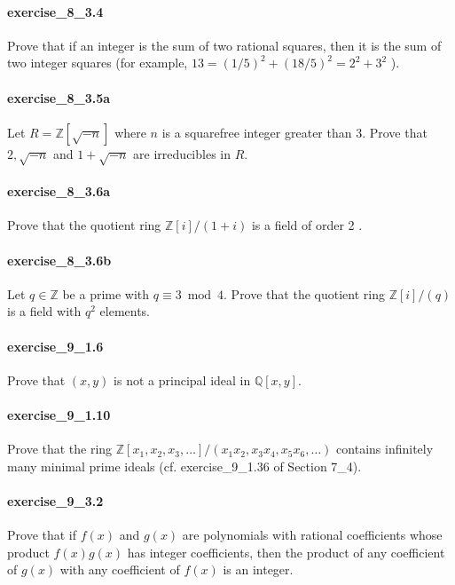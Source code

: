 \documentclass{article}
\begin{document}
\paragraph{exercise\_8\_3.4} Prove that if an integer is the sum of two rational squares, then it is the sum of two integer squares (for example, $13=(1 / 5)^{2}+(18 / 5)^{2}=2^{2}+3^{2}$ ).

\paragraph{exercise\_8\_3.5a} Let $R=\mathbb{Z}[\sqrt{-n}]$ where $n$ is a squarefree integer greater than 3. Prove that $2, \sqrt{-n}$ and $1+\sqrt{-n}$ are irreducibles in $R$.

\paragraph{exercise\_8\_3.6a} Prove that the quotient ring $\mathbb{Z}[i] /(1+i)$ is a field of order 2 .

\paragraph{exercise\_8\_3.6b} Let $q \in \mathbb{Z}$ be a prime with $q \equiv 3 \bmod 4$. Prove that the quotient ring $\mathbb{Z}[i] /(q)$ is a field with $q^{2}$ elements.

\paragraph{exercise\_9\_1.6} Prove that $(x, y)$ is not a principal ideal in $\mathbb{Q}[x, y]$.

\paragraph{exercise\_9\_1.10} Prove that the ring $\mathbb{Z}\left[x_{1}, x_{2}, x_{3}, \ldots\right] /\left(x_{1} x_{2}, x_{3} x_{4}, x_{5} x_{6}, \ldots\right)$ contains infinitely many minimal prime ideals (cf. exercise\_9\_1.36 of Section 7\_4).

\paragraph{exercise\_9\_3.2} Prove that if $f(x)$ and $g(x)$ are polynomials with rational coefficients whose product $f(x) g(x)$ has integer coefficients, then the product of any coefficient of $g(x)$ with any coefficient of $f(x)$ is an integer.
\end{document}
